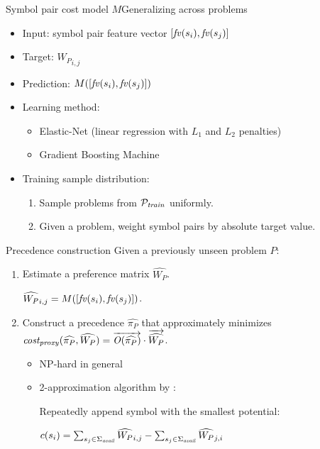 \documentclass[notes]{beamer}
\begin{document}
\begin{frame}{Symbol pair cost model $M$}{Generalizing across problems}
\begin{itemize}
	\item Input: symbol pair feature vector $[\mathit{fv}(s_i), \mathit{fv}(s_j)]$
	\item Target: ${W_P}_{i,j}$
	\item Prediction: $M([\mathit{fv}(s_i), \mathit{fv}(s_j)])$
	\item Learning method:
	\begin{itemize}
		\item Elastic-Net (linear regression with $L_1$ and $L_2$ penalties)
		\item Gradient Boosting Machine
	\end{itemize}
	\item Training sample distribution:
	\begin{enumerate}
		\item Sample problems from $\mathcal{P}_{\mathit{train}}$ uniformly.
		\item Given a problem, weight symbol pairs by absolute target value.
	\end{enumerate}
\end{itemize}
\end{frame}

\begin{frame}{Precedence construction}
Given a previously unseen problem $P$:
\begin{enumerate}
	\item Estimate a preference matrix $\widehat{W_P}$.
	
	$\widehat{W_P}_{i,j} = M([\mathit{fv}(s_i), \mathit{fv}(s_j)])$.
	\item Construct a precedence \(\widehat{\pi_P}\) that approximately minimizes
	$\operatorname{\mathit{cost_{proxy}}}(\widehat{\pi_P}, \widehat{W_P}) = \overrightarrow{\operatorname{\mathit{O}}(\widehat{\pi_P})} \cdot \overrightarrow{\widehat{W_P}}$.
	\begin{itemize}
		\item NP-hard in general
		\item 2-approximation algorithm by \citet{Cohen2011}:
		
		Repeatedly append symbol with the smallest potential:
		
		$c(s_i) = \sum_{s_j \in \operatorname{\Sigma}_{\mathit{avail}}} \widehat{W_P}_{i, j} - \sum_{s_j \in \operatorname{\Sigma}_{\mathit{avail}}} \widehat{W_P}_{j, i}$
	\end{itemize}
\end{enumerate}
\end{frame}
\end{document}
